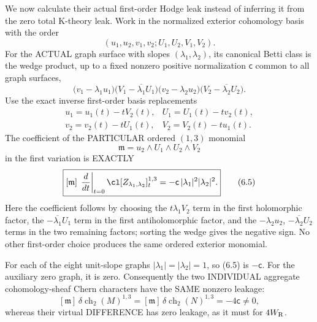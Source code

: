\documentclass[11pt,a4paper]{article}
\newcommand{\ch}{\operatorname{ch}}
\begin{document}
We now calculate their actual
first-order Hodge leak instead
of inferring it from the
zero total K-theory leak.
Work in the normalized exterior
cohomology basis with the order
\[
 (u_1,u_2,v_1,v_2;
              U_1,U_2,V_1,V_2).
\]
For the ACTUAL graph surface
with slopes \((\lambda_1,\lambda_2)\),
its canonical Betti class is the
wedge product, up to a fixed
nonzero positive normalization
\(\mathsf c\) common to all
graph surfaces,
\[
 \bigl(v_1-\lambda_1u_1\bigr)
 \bigl(V_1-\overline{\lambda_1}U_1\bigr)
 \bigl(v_2-\lambda_2u_2\bigr)
 \bigl(V_2-\overline{\lambda_2}U_2\bigr).
\]
Use the exact inverse first-order
basis replacements
\[
 \begin{array}{ll}
 u_1=u_1(t)-tV_2(t),&
 U_1=U_1(t)-tv_2(t),\\
 v_2=v_2(t)-tU_1(t),&
 V_2=V_2(t)-tu_1(t).
 \end{array}
\]
The coefficient of the PARTICULAR
ordered \((1,3)\) monomial
\[
        {\mathfrak m}
             =u_2\wedge U_1\wedge U_2\wedge V_2
\]
in the first variation is EXACTLY
\[
 \boxed{
 [\mathfrak m]\,
 \left.\frac{d}{dt}\right|_{t=0}
    \cl[Z_{\lambda_1,\lambda_2}]_t^{1,3}
 =-\mathsf c\,
             |\lambda_1|^2|\lambda_2|^2 .
 }                                                       \tag{6.5}
\]
Here the coefficient follows by
choosing the \(t\lambda_1V_2\)
term in the first holomorphic
factor, the
\(-\overline{\lambda_1}U_1\)
term in the first antiholomorphic
factor, and the
\(-\lambda_2u_2\),
\(-\overline{\lambda_2}U_2\)
terms in the two remaining
factors; sorting the wedge gives
the negative sign.
No other first-order choice
produces the same ordered
exterior monomial.

For each of the eight unit-slope
graphs \(|\lambda_1|=|\lambda_2|=1\),
so (6.5) is \(-\mathsf c\).
For the auxiliary zero graph,
it is zero. Consequently
the two INDIVIDUAL aggregate
cohomology-sheaf Chern characters
have the SAME nonzero leakage:
\[
 \boxed{
 [\mathfrak m]\,
 \delta\ch_2(M)^{1,3}
   =[\mathfrak m]\,
      \delta\ch_2(N)^{1,3}
   =-4\mathsf c\ne0,
 }                                                       \tag{6.6}
\]
whereas their virtual
DIFFERENCE has zero leakage,
as it must for \(4W_{\rm R}\).
\end{document}
